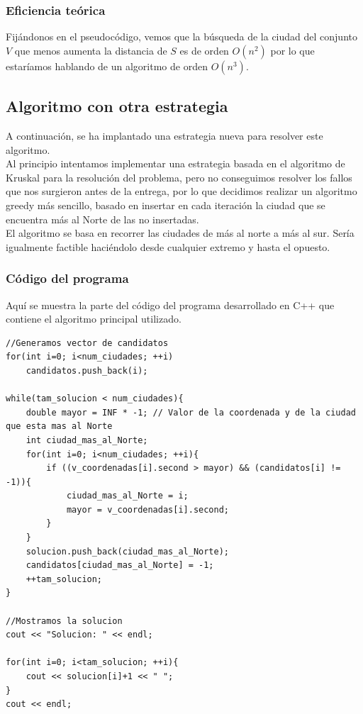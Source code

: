 \documentclass[11pt,a4paper]{article} %
\begin{document}
\subsubsection{Eficiencia teórica}
Fijándonos en el pseudocódigo, vemos que la búsqueda de la ciudad del conjunto $V$ que menos aumenta la distancia de $S$ es de orden $O(n^2)$ por lo que estaríamos hablando de un algoritmo de orden $O(n^3)$.


\newpage
\subsection{Algoritmo con otra estrategia}
A continuación, se ha implantado una estrategia nueva para resolver este algoritmo.\\

Al principio intentamos implementar una estrategia basada en el algoritmo de Kruskal para la resolución del problema, pero no conseguimos resolver los fallos que nos surgieron antes de la entrega, por lo que decidimos realizar un algoritmo greedy más sencillo, basado en insertar en cada iteración la ciudad que se encuentra más al Norte de las no insertadas.\\


El algoritmo se basa en recorrer las ciudades de más al norte a más al sur. Sería igualmente factible haciéndolo desde cualquier extremo y hasta el opuesto.\\

\subsubsection{Código del programa}
Aquí se muestra la parte del código del programa desarrollado en C++ que contiene el algoritmo principal utilizado.

\begin{lstlisting}[style=C++]
//Generamos vector de candidatos
for(int i=0; i<num_ciudades; ++i)
	candidatos.push_back(i);

while(tam_solucion < num_ciudades){
	double mayor = INF * -1; // Valor de la coordenada y de la ciudad que esta mas al Norte
	int ciudad_mas_al_Norte;
	for(int i=0; i<num_ciudades; ++i){
		if ((v_coordenadas[i].second > mayor) && (candidatos[i] != -1)){
			ciudad_mas_al_Norte = i;
			mayor = v_coordenadas[i].second;
		}
	}
	solucion.push_back(ciudad_mas_al_Norte);
	candidatos[ciudad_mas_al_Norte] = -1;
	++tam_solucion;
}

//Mostramos la solucion
cout << "Solucion: " << endl;

for(int i=0; i<tam_solucion; ++i){
	cout << solucion[i]+1 << " ";
}
cout << endl;
\end{lstlisting}
\end{document}
